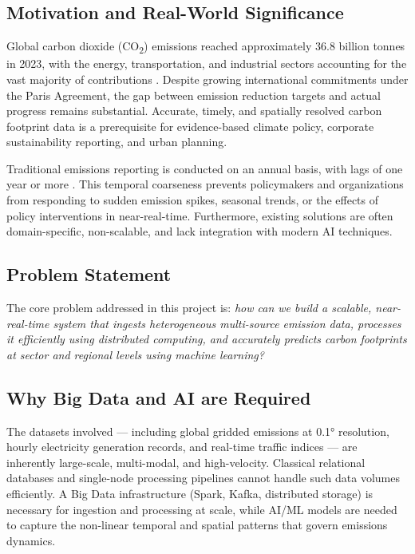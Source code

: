 \documentclass[conference]{IEEEtran}
\begin{document}
\subsection{Motivation and Real-World Significance}
Global carbon dioxide (CO\textsubscript{2}) emissions reached approximately 36.8 billion tonnes in 2023, with the energy, transportation, and industrial sectors accounting for the vast majority of contributions \cite{carbonmonitor2020}. Despite growing international commitments under the Paris Agreement, the gap between emission reduction targets and actual progress remains substantial. Accurate, timely, and spatially resolved carbon footprint data is a prerequisite for evidence-based climate policy, corporate sustainability reporting, and urban planning.

Traditional emissions reporting is conducted on an annual basis, with lags of one year or more \cite{edgar2021}. This temporal coarseness prevents policymakers and organizations from responding to sudden emission spikes, seasonal trends, or the effects of policy interventions in near-real-time. Furthermore, existing solutions are often domain-specific, non-scalable, and lack integration with modern AI techniques.

\subsection{Problem Statement}
The core problem addressed in this project is: \textit{how can we build a scalable, near-real-time system that ingests heterogeneous multi-source emission data, processes it efficiently using distributed computing, and accurately predicts carbon footprints at sector and regional levels using machine learning?}

\subsection{Why Big Data and AI are Required}
The datasets involved — including global gridded emissions at 0.1° resolution, hourly electricity generation records, and real-time traffic indices — are inherently large-scale, multi-modal, and high-velocity. Classical relational databases and single-node processing pipelines cannot handle such data volumes efficiently. A Big Data infrastructure (Spark, Kafka, distributed storage) is necessary for ingestion and processing at scale, while AI/ML models are needed to capture the non-linear temporal and spatial patterns that govern emissions dynamics.
\end{document}
